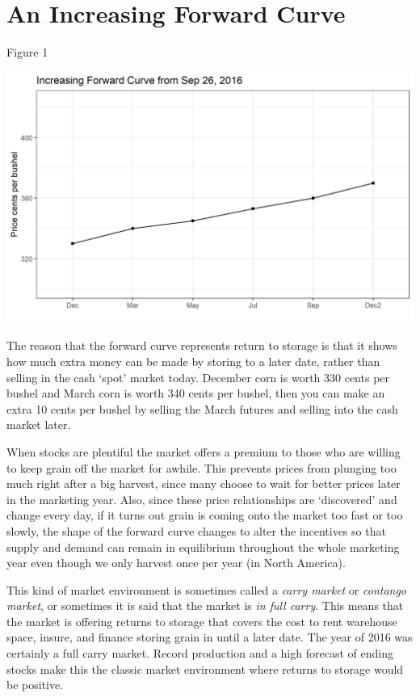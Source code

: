 \documentclass[
]{book}
\begin{document}
\hypertarget{an-increasing-forward-curve}{%
\section{An Increasing Forward Curve}\label{an-increasing-forward-curve}}

Figure 1

\includegraphics{assets/PricesSpaceTime-increasing-9-26-2016.png}

The reason that the forward curve represents return to storage is that it shows how much extra money can be made by storing to a later date, rather than selling in the cash `spot' market today. December corn is worth 330 cents per bushel and March corn is worth 340 cents per bushel, then you can make an extra 10 cents per bushel by selling the March futures and selling into the cash market later.

When stocks are plentiful the market offers a premium to those who are willing to keep grain off the market for awhile. This prevents prices from plunging too much right after a big harvest, since many choose to wait for better prices later in the marketing year. Also, since these price relationships are `discovered' and change every day, if it turns out grain is coming onto the market too fast or too slowly, the shape of the forward curve changes to alter the incentives so that supply and demand can remain in equilibrium throughout the whole marketing year even though we only harvest once per year (in North America).

This kind of market environment is sometimes called a \emph{carry market} or \emph{contango market}, or sometimes it is said that the market is \emph{in full carry}. This means that the market is offering returns to storage that covers the cost to rent warehouse space, insure, and finance storing grain in until a later date. The year of 2016 was certainly a full carry market. Record production and a high forecast of ending stocks make this the classic market environment where returns to storage would be positive.
\end{document}
